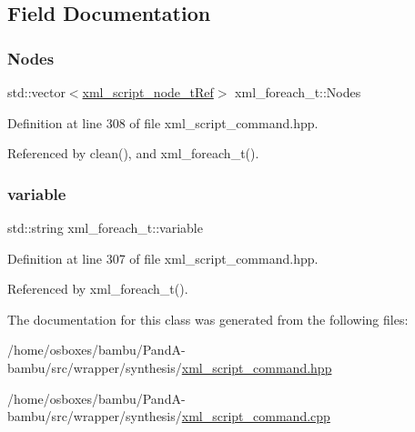 \subsection{Field Documentation}
\mbox{\label{structxml__foreach__t_ad384e2c406cf9d90ea61e86f79508ae0}} 
\subsubsection{\texorpdfstring{Nodes}{Nodes}}
{\footnotesize\ttfamily std\+::vector$<$\hyperlink{xml__script__command_8hpp_a1fe3d50ade66bc35e41be9b68bbbcd02}{xml\+\_\+script\+\_\+node\+\_\+t\+Ref}$>$ xml\+\_\+foreach\+\_\+t\+::\+Nodes}



Definition at line 308 of file xml\+\_\+script\+\_\+command.\+hpp.



Referenced by clean(), and xml\+\_\+foreach\+\_\+t().

\mbox{\label{structxml__foreach__t_adbbef3da3d07538440bf7c7d2f1668f9}} 
\subsubsection{\texorpdfstring{variable}{variable}}
{\footnotesize\ttfamily std\+::string xml\+\_\+foreach\+\_\+t\+::variable}



Definition at line 307 of file xml\+\_\+script\+\_\+command.\+hpp.



Referenced by xml\+\_\+foreach\+\_\+t().



The documentation for this class was generated from the following files\+:\begin{DoxyCompactItemize}
\item 
/home/osboxes/bambu/\+Pand\+A-\/bambu/src/wrapper/synthesis/\hyperlink{xml__script__command_8hpp}{xml\+\_\+script\+\_\+command.\+hpp}\item 
/home/osboxes/bambu/\+Pand\+A-\/bambu/src/wrapper/synthesis/\hyperlink{xml__script__command_8cpp}{xml\+\_\+script\+\_\+command.\+cpp}\end{DoxyCompactItemize}
